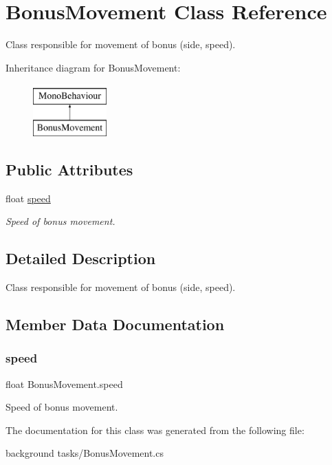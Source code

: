 \hypertarget{class_bonus_movement}{}\section{Bonus\+Movement Class Reference}
\label{class_bonus_movement}


Class responsible for movement of bonus (side, speed).  


Inheritance diagram for Bonus\+Movement\+:\begin{figure}[H]
\begin{center}
\leavevmode
\includegraphics[height=2.000000cm]{class_bonus_movement}
\end{center}
\end{figure}
\subsection*{Public Attributes}
\begin{DoxyCompactItemize}
\item 
float \mbox{\hyperlink{class_bonus_movement_af663a81c63835c143bc17cb1f86e8e46}{speed}}
\begin{DoxyCompactList}\small\item\em Speed of bonus movement. \end{DoxyCompactList}\end{DoxyCompactItemize}


\subsection{Detailed Description}
Class responsible for movement of bonus (side, speed). 



\subsection{Member Data Documentation}
\mbox{\label{class_bonus_movement_af663a81c63835c143bc17cb1f86e8e46}} 
\subsubsection{\texorpdfstring{speed}{speed}}
{\footnotesize\ttfamily float Bonus\+Movement.\+speed}



Speed of bonus movement. 



The documentation for this class was generated from the following file\+:\begin{DoxyCompactItemize}
\item 
background tasks/Bonus\+Movement.\+cs\end{DoxyCompactItemize}
